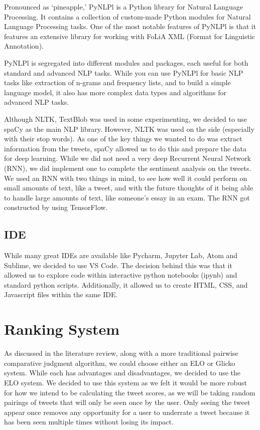	Pronounced as ‘pineapple,’ PyNLPl is a Python library for Natural Language Processing. It contains a collection of custom-made Python modules for Natural Language Processing tasks. One of the most notable features of PyNLPl is that it features an extensive library for working with FoLiA XML (Format for Linguistic Annotation).
	
	PyNLPl is segregated into different modules and packages, each useful for both standard and advanced NLP tasks. While you can use PyNLPl for basic NLP tasks like extraction of n-grams and frequency lists, and to build a simple language model, it also has more complex data types and algorithms for advanced NLP tasks. 
	
	Although NLTK, TextBlob was used in some experimenting, we decided to use spaCy as the main NLP library. However, NLTK was used on the side (especially with their stop words). As one of the key things we wanted to do was extract information from the tweets, spaCy allowed us to do this and prepare the data for deep learning. While we did not need a very deep Recurrent Neural Network (RNN), we did implement one to complete the sentiment analysis on the tweets. We used an RNN with two things in mind, to see how well it could perform on small amounts of text, like a tweet, and with the future thoughts of it being able to handle large amounts of text, like someone's essay in an exam. The RNN got constructed by using TensorFlow.
	
	\subsection{IDE}
	While many great IDEs are available like Pycharm, Jupyter Lab, Atom and Sublime, we decided to use VS Code. The decision behind this was that it allowed us to explore code within interactive python notebooks (ipynb) and standard python scripts. Additionally, it allowed us to create HTML, CSS, and Javascript files within the same IDE.
	
	
	\section{Ranking System}
	
	As discussed in the literature review, along with a more traditional pairwise comparative judgment algorithm, we could choose either an ELO or Glicko system. While each has advantages and disadvantages, we decided to use the ELO system. We decided to use this system as we felt it would be more robust for how we intend to be calculating the tweet scores, as we will be taking random pairings of tweets that will only be seen once by the user. Only seeing the tweet appear once removes any opportunity for a user to underrate a tweet because it has been seen multiple times without losing its impact. 
	
